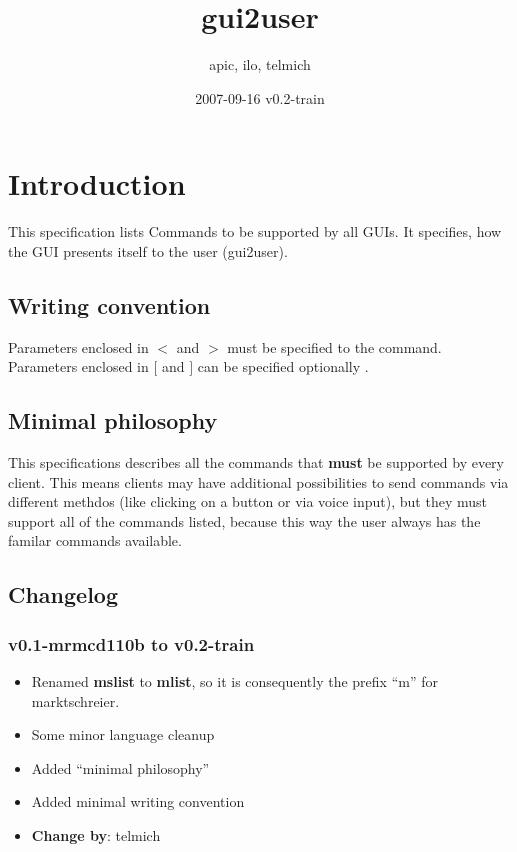 \documentclass[12pt,a4paper]{article}
\begin{document}
\title{gui2user}
\date{2007-09-16 v0.2-train}
\author{apic, ilo, telmich}

\maketitle

\section{Introduction}
This specification lists Commands to be supported by all GUIs. It
specifies, how the GUI presents itself to the user (gui2user).

\subsection{Writing convention}
Parameters enclosed in $<$ and $>$ must be specified to the command.
Parameters enclosed in $[$ and $]$ can be specified optionally .

\subsection{Minimal philosophy}
This specifications describes all the commands that \textbf{must} be
supported by every client. This means clients may have additional possibilities
to send commands via different methdos (like clicking on a button or via
voice input), but they must support all of the commands listed, because this
way the user always has the familar commands available.

\subsection{Changelog}
\subsubsection{v0.1-mrmcd110b to v0.2-train}
   \begin{itemize}
      \item Renamed \textbf{mslist} to \textbf{mlist}, so it is consequently the prefix
      "`m"' for marktschreier.
      \item Some minor language cleanup 
      \item Added "`minimal philosophy"'
      \item Added minimal writing convention
      \item \textbf{Change by}: telmich
   \end{itemize}
\end{document}
